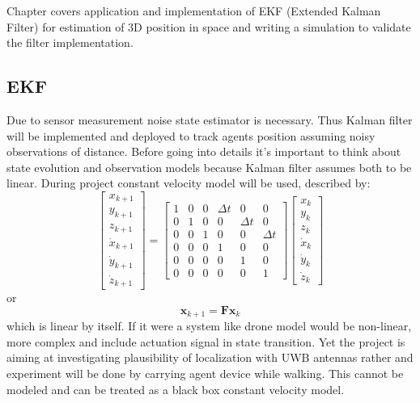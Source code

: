 Chapter covers application and implementation of EKF (Extended Kalman Filter) for estimation of 3D position in space and writing a simulation to validate the filter implementation.

\subsection{EKF}

Due to sensor measurement noise state estimator is necessary. Thus Kalman filter will be implemented and deployed to track agents position assuming noisy observations of distance. Before going into details it's important to think about state evolution and observation models because Kalman filter assumes both to be linear. During project constant velocity model will be used, described by:
$$
    \left[\begin{array}{c}
            x_{k+1}       \\
            y_{k+1}       \\
            z_{k+1}       \\
            \dot{x}_{k+1} \\
            \dot{y}_{k+1} \\
            \dot{z}_{k+1}
        \end{array}\right]=\left[\begin{array}{cccccc}
            1 & 0 & 0 & \Delta t & 0        & 0        \\
            0 & 1 & 0 & 0        & \Delta t & 0        \\
            0 & 0 & 1 & 0        & 0        & \Delta t \\
            0 & 0 & 0 & 1        & 0        & 0        \\
            0 & 0 & 0 & 0        & 1        & 0        \\
            0 & 0 & 0 & 0        & 0        & 1
        \end{array}\right]\left[\begin{array}{c}
            x_{k}       \\
            y_{k}       \\
            z_{k}       \\
            \dot{x}_{k} \\
            \dot{y}_{k} \\
            \dot{z}_{k}
        \end{array}\right]
$$
or
$$
    \boldsymbol{x}_{k+1} = \boldsymbol{F} \boldsymbol{x}_k
$$
which is linear by itself. If it were a system like drone model would be non-linear, more complex and include actuation signal in state transition. Yet the project is aiming at investigating plausibility of localization with UWB antennas rather and experiment will be done by carrying agent device while walking. This cannot be modeled and can be treated as  a black box constant velocity model.


